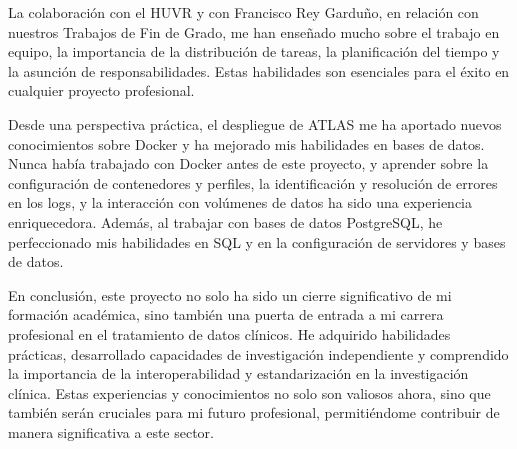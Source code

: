 La colaboración con el HUVR y con Francisco Rey Garduño, en relación con nuestros Trabajos de Fin de Grado, me han enseñado mucho sobre el trabajo en equipo, la importancia de la distribución de tareas, la planificación del tiempo y la asunción de responsabilidades. Estas habilidades son esenciales para el éxito en cualquier proyecto profesional.

Desde una perspectiva práctica, el despliegue de ATLAS me ha aportado nuevos conocimientos sobre Docker y ha mejorado mis habilidades en bases de datos. Nunca había trabajado con Docker antes de este proyecto, y aprender sobre la configuración de contenedores y perfiles, la identificación y resolución de errores en los logs, y la interacción con volúmenes de datos ha sido una experiencia enriquecedora. Además, al trabajar con bases de datos PostgreSQL, he perfeccionado mis habilidades en SQL y en la configuración de servidores y bases de datos.

En conclusión, este proyecto no solo ha sido un cierre significativo de mi formación académica, sino también una puerta de entrada a mi carrera profesional en el tratamiento de datos clínicos. He adquirido habilidades prácticas, desarrollado capacidades de investigación independiente y comprendido la importancia de la interoperabilidad y estandarización en la investigación clínica. Estas experiencias y conocimientos no solo son valiosos ahora, sino que también serán cruciales para mi futuro profesional, permitiéndome contribuir de manera significativa a este sector.



